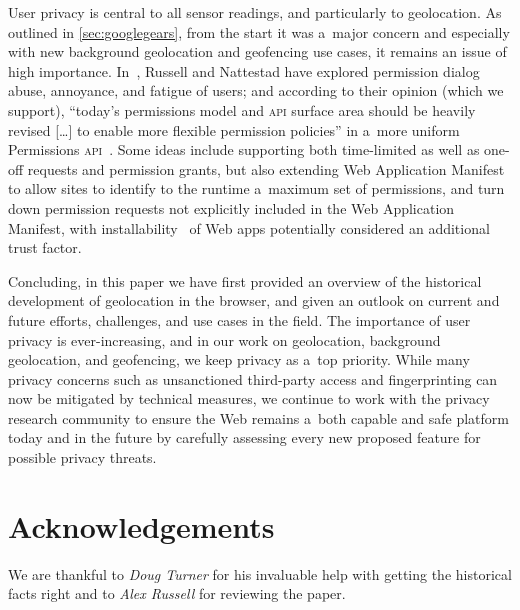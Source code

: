 \documentclass[sigconf,hyphens]{acmart}
\begin{document}
User privacy is central to all sensor readings, and particularly to geolocation.
As outlined in \autoref{sec:googlegears}, from the start it was a~major concern
and especially with new background geolocation and geofencing use cases,
it remains an issue of high importance.
In~\cite{russell2018permissions}, Russell and Nattestad have explored permission dialog
abuse, annoyance, and fatigue of users; and according to their opinion (which we support),
``today's permissions model and \textsc{api} surface area should be heavily revised
[\ldots] to enable more flexible permission policies'' in a~more uniform
Permissions \textsc{api}~\cite{lamouri2017permissions}.
Some ideas include supporting both time-limited as well as one-off requests and permission grants,
but also extending Web Application Manifest~\cite{caceres2018manifest}
to allow sites to identify to the runtime a~maximum set of permissions,
and turn down permission requests not explicitly included in the Web Application Manifest,
with installability~\cite{caceres2018manifest} of Web apps potentially considered an additional
trust factor.

Concluding, in this paper we have first provided an overview
of the historical development of geolocation in the browser,
and given an outlook on current and future efforts, challenges, and use cases in the field.
The importance of user privacy is ever-increasing, and in our work on geolocation,
background geolocation, and geofencing,
we keep privacy as a~top priority.
While many privacy concerns such as unsanctioned third-party access and fingerprinting
can now be mitigated by technical measures, we continue to work with the privacy research community
to ensure the Web remains a~both capable and safe platform today and in the future
by carefully assessing every new proposed feature for possible privacy threats.

\section*{Acknowledgements}

We are thankful to \textit{Doug Turner} for his invaluable help
with getting the historical facts right and to \textit{Alex Russell} for reviewing the paper.

\newpage



\end{document}
